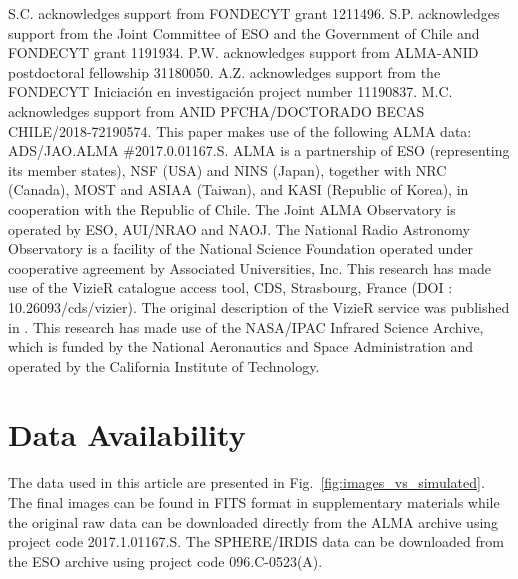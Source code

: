\documentclass[fleqn,usenatbib,useAMS]{mnras}
\begin{document}
S.C. acknowledges support from FONDECYT grant 1211496. S.P. acknowledges support from the Joint Committee of ESO and the Government of Chile and FONDECYT grant 1191934. P.W. acknowledges support from ALMA-ANID postdoctoral fellowship 31180050. A.Z. acknowledges support from the FONDECYT Iniciaci\'on en investigaci\'on project number 11190837. M.C. acknowledges support from ANID PFCHA/DOCTORADO BECAS CHILE/2018-72190574. This paper makes use of the following ALMA data: ADS/JAO.ALMA \#2017.0.01167.S. ALMA is a partnership of ESO (representing its member states), NSF (USA) and NINS (Japan), together with NRC (Canada), MOST and ASIAA (Taiwan), and KASI (Republic of Korea), in cooperation with the Republic of Chile. The Joint ALMA Observatory is operated by ESO, AUI/NRAO and NAOJ. The National Radio Astronomy Observatory is a facility of the National Science Foundation operated under cooperative agreement by Associated Universities, Inc. This research has made use of the VizieR catalogue access tool, CDS, Strasbourg, France (DOI : 10.26093/cds/vizier). The original description of the VizieR service was published in \citet{2000A&AS..143...23O}. This research has made use of the NASA/IPAC Infrared Science Archive, which is funded by the National Aeronautics and Space Administration and operated by the California Institute of Technology.

\section*{Data Availability}

The data used in this article are presented in Fig.~\ref{fig:images_vs_simulated}. The final images can be found in FITS format in supplementary materials while the original raw data can be downloaded directly from the ALMA archive using project code 2017.1.01167.S. The SPHERE/IRDIS data can be downloaded from the ESO archive using project code 096.C-0523(A).






\end{document}
